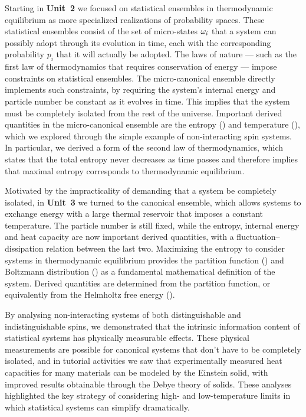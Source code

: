 Starting in \textbf{Unit~2} we focused on statistical ensembles in thermodynamic equilibrium as more specialized realizations of probability spaces.
These statistical ensembles consist of the set of micro-states $\omega_i$ that a system can possibly adopt through its evolution in time, each with the corresponding probability $p_i$ that it will actually be adopted.
The laws of nature --- such as the first law of thermodynamics that requires conservation of energy --- impose constraints on statistical ensembles.
The micro-canonical ensemble directly implements such constraints, by requiring the system's internal energy and particle number be constant as it evolves in time.
This implies that the system must be completely isolated from the rest of the universe.
Important derived quantities in the micro-canonical ensemble are the entropy () and temperature (), which we explored through the simple example of non-interacting spin systems.
In particular, we derived a form of the second law of thermodynamics, which states that the total entropy never decreases as time passes and therefore implies that maximal entropy corresponds to thermodynamic equilibrium.

Motivated by the impracticality of demanding that a system be completely isolated, in \textbf{Unit~3} we turned to the canonical ensemble, which allows systems to exchange energy with a large thermal reservoir that imposes a constant temperature.
The particle number is still fixed, while the entropy, internal energy and heat capacity are now important derived quantities, with a fluctuation--dissipation relation between the last two.
Maximizing the entropy to consider systems in thermodynamic equilibrium provides the partition function () and Boltzmann distribution () as a fundamental mathematical definition of the system.
Derived quantities are determined from the partition function, or equivalently from the Helmholtz free energy ().

By analysing non-interacting systems of both distinguishable and indistinguishable spins, we demonstrated that the intrinsic information content of statistical systems has physically measurable effects.
These physical measurements are possible for canonical systems that don't have to be completely isolated, and in tutorial activities we saw that experimentally measured heat capacities for many materials can be modeled by the Einstein solid, with improved results obtainable through the Debye theory of solids.
These analyses highlighted the key strategy of considering high- and low-temperature limits in which statistical systems can simplify dramatically.

